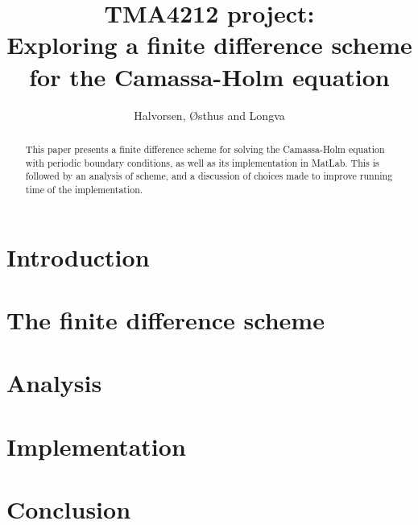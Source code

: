 \documentclass{article}
\title{TMA4212 project: \\ Exploring a finite difference scheme for the Camassa-Holm equation}
\author{Halvorsen, Østhus and Longva}
\begin{document}
\maketitle

\begin{abstract}
This paper presents a finite difference scheme for solving the Camassa-Holm equation with periodic boundary conditions, as well as its implementation in MatLab. This is followed by an analysis of scheme, and a discussion of choices made to improve running time of the implementation. 
\end{abstract}


\section*{Introduction}


\newpage

\section*{The finite difference scheme}



%

\newpage

\section*{Analysis}



\section*{Implementation}


\section*{Conclusion}



{}

\end{document}
